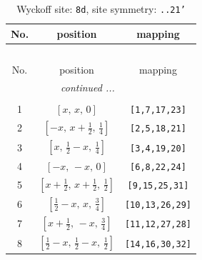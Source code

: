 \documentclass[fleqn,8pt]{jsarticle}
\begin{document}
\begin{longtable}{ccc}
\caption{Wyckoff site: {\tt 8d}, site symmetry: {\tt ..21'}}
 \\
 \hline \hline
No. & position & mapping \\ \hline \endfirsthead

\multicolumn{2}{l}{\tablename\ \thetable{}} \\
 \hline \hline
No. & position & mapping \\ \hline \endhead

 \hline \hline
\multicolumn{2}{r}{\footnotesize\it continued ...} \\ \endfoot

 \hline \hline
\multicolumn{2}{r}{} \\ \endlastfoot

1 & $\left[ x,\, x,\, 0 \right]$ & {\tt [1,7,17,23]} \\ \hline
2 & $\left[ - x,\, x + \frac{1}{2},\, \frac{1}{4} \right]$ & {\tt [2,5,18,21]} \\ \hline
3 & $\left[ x,\, \frac{1}{2} - x,\, \frac{1}{4} \right]$ & {\tt [3,4,19,20]} \\ \hline
4 & $\left[ - x,\, - x,\, 0 \right]$ & {\tt [6,8,22,24]} \\ \hline
5 & $\left[ x + \frac{1}{2},\, x + \frac{1}{2},\, \frac{1}{2} \right]$ & {\tt [9,15,25,31]} \\ \hline
6 & $\left[ \frac{1}{2} - x,\, x,\, \frac{3}{4} \right]$ & {\tt [10,13,26,29]} \\ \hline
7 & $\left[ x + \frac{1}{2},\, - x,\, \frac{3}{4} \right]$ & {\tt [11,12,27,28]} \\ \hline
8 & $\left[ \frac{1}{2} - x,\, \frac{1}{2} - x,\, \frac{1}{2} \right]$ & {\tt [14,16,30,32]} \\
\end{longtable}
\renewcommand{\arraystretch}{1.2}
\end{document}
